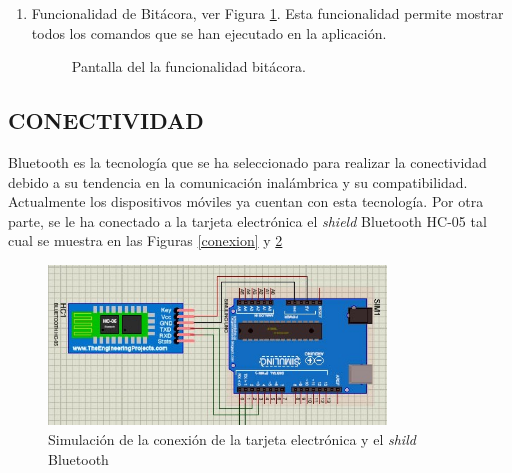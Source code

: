 \begin{enumerate}
\item Funcionalidad de Bitácora, ver Figura \ref{bitacora}. Esta funcionalidad permite mostrar todos los comandos que se han ejecutado en la aplicación.
\begin{figure}[H]
\centering
{}\hspace{5mm}
\caption{Pantalla del la funcionalidad bitácora.}
\label{bitacora}
\end{figure}

\end{enumerate}











\subsection{CONECTIVIDAD}

Bluetooth es la tecnología que se ha seleccionado para realizar la conectividad debido a su tendencia en la comunicación inalámbrica y su compatibilidad. Actualmente los dispositivos móviles ya cuentan con esta tecnología. Por otra parte, se le ha conectado a la tarjeta electrónica el \textit{shield} Bluetooth HC-05 tal cual se muestra en las Figuras \ref{conexion} y \ref{conexion2}\\


%
\begin{figure}[H]
\centering
\includegraphics[width=0.8\textwidth]{metodologia/conexion_bluetooth2.jpg}
\caption{Simulación de la conexión de la tarjeta electrónica y el \textit{shild} Bluetooth}
\label{conexion2}
\end{figure}

